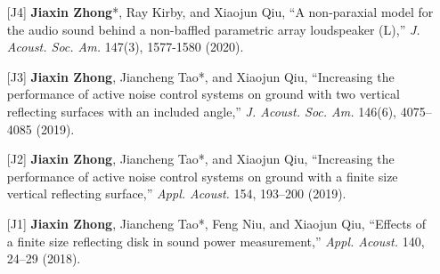 \documentclass[10pt,a4paper,ragged2e,withhyper]{altacv}
\newcommand{\PubJournal}[1]{\textit{#1}}
\newcommand{\PubTitle}[1]{``{#1,}''}
\newcommand{\PubCorAuthor}[1]{#1*}
\begin{document}
\begin{itemize}[leftmargin = 30pt]
    \item[{[J4]}] \PubCorAuthor{\textbf{Jiaxin Zhong}}, Ray Kirby, and Xiaojun Qiu,
        \PubTitle{A non-paraxial model for the audio sound behind a non-baffled parametric array loudspeaker (L)}
        \PubJournal{J. Acoust. Soc. Am.}
        147(3), 1577-1580 (2020).
        \href{https://doi.org/10.1121/10.0000793}{\color{accent}\aiDoi}
        \href{https://github.com/JiaxinZhong/JiaxinZhong.github.io/raw/master/publications/journal/Zhong2020-JASA-PAL_disk.pdf}{\color{accent}\faFilePdf[regular]}

    \item[{[J3]}] \textbf{Jiaxin Zhong}, \PubCorAuthor{Jiancheng Tao}, and Xiaojun Qiu, 
        \PubTitle{Increasing the performance of active noise control systems on ground with two vertical reflecting surfaces with an included angle} 
        \PubJournal{J. Acoust. Soc. Am.}
        146(6), 4075--4085 (2019).
        \href{https://doi.org/10.1121/1.5134062}{\color{accent}\aiDoi}
        \href{https://github.com/JiaxinZhong/JiaxinZhong.github.io/raw/master/publications/journal/Zhong2019-JASA-ANC_surface_included_angle.pdf}{\color{accent}\faFilePdf[regular]}

    \item[{[J2]}] \textbf{Jiaxin Zhong}, \PubCorAuthor{Jiancheng Tao}, and Xiaojun Qiu,
        \PubTitle{Increasing the performance of active noise control systems on ground with a finite size vertical reflecting surface}
        \PubJournal{Appl. Acoust.} 
        154, 193--200 (2019).
        \href{https://doi.org/10.1016/j.apacoust.2019.05.002}{\color{accent}\aiDoi}
        \href{https://github.com/JiaxinZhong/JiaxinZhong.github.io/raw/master/publications/journal/Zhong2019-AA-ANC_finite_size_surface.pdf}{\color{accent}\faFilePdf[regular]}

    \item[{[J1]}] \textbf{Jiaxin Zhong}, \PubCorAuthor{Jiancheng Tao}, Feng Niu, and Xiaojun Qiu,
        \PubTitle{Effects of a finite size reflecting disk in sound power measurement}
        \PubJournal{Appl. Acoust.}
        140, 24--29 (2018).
        \href{https://doi.org/10.1016/j.apacoust.2018.05.007}{\color{accent}\aiDoi}
        \href{https://github.com/JiaxinZhong/JiaxinZhong.github.io/raw/master/publications/journal/Zhong2018-AA-Sound_power.pdf}{\color{accent}\faFilePdf[regular]}
\end{itemize}


\divider

\newpage
{}
\end{document}

